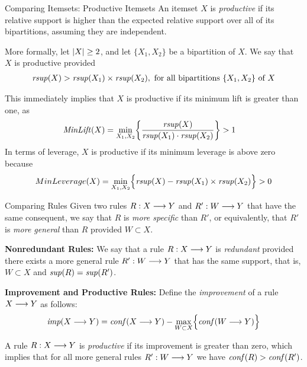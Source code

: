 \begin{frame}{Comparing Itemsets: Productive Itemsets}
An itemset $X$ is {\em productive}
if its
relative support is higher than the expected
relative support over all of its bipartitions,
assuming they are independent.

More formally, let $|X| \ge 2$, and let
$\{X_1,X_2\}$ be a bipartition of $X$.
We say that $X$ is productive provided
\begin{align*}
\mathit{rsup}(X) > \mathit{rsup}(X_1) \times \mathit{rsup}(X_2),
\text{ for all bipartitions } \{X_1, X_2\} \text{ of } X
\end{align*}

\bigskip
This immediately implies that
$X$ is productive if its minimum lift is greater than one, as
\begin{align*}
  \mathit{MinLift}(X) & =
  \min_{X_1,X_2} \biggl\{ \frac{\mathit{rsup}(X)}{\mathit{rsup}(X_1) \cdot
  \mathit{rsup}(X_2)} \biggr\}
  > 1
\end{align*}
In terms of leverage, $X$ is productive if its minimum leverage is above
zero because
\begin{align*}
MinLeverage(X) =
\min_{X_1,X_2} \Bigl\{
\mathit{rsup}(X) - \mathit{rsup}(X_1) \times \mathit{rsup}(X_2)
\Bigr\} > 0
\end{align*}
\end{frame}


\begin{frame}{Comparing Rules}
Given two rules $R: X \arule Y$ and $R': W \arule Y$ that have the same
consequent, we say that $R$ is {\em more specif\/{i}c} than $R'$, or
equivalently, that $R'$ is {\em more general} than $R$
provided $W \subset X$.

\medskip
{\bf Nonredundant Rules:} We say that a rule $R: X \arule Y$
is {\em redundant} provided there exists a more general rule
$R': W \arule Y$ that has the same support, that is, $W\subset X$ and $\mathit{sup}(R) = \mathit{sup}(R')$.

\medskip
{\bf Improvement and Productive Rules:}
Def\/{i}ne the {\em improvement}
of
a rule $X \arule Y$ as follows:
\begin{align*}
\textit{imp}(X \arule Y) = \conff (X \arule Y)
- \max_{W \subset X} \Bigl\{\conff (W \arule Y) \Bigr\}
\end{align*}

\medskip
A rule $R: X \arule Y$ is {\em productive} if
its improvement is greater than zero, which implies that
for all more general rules $R': W \arule
Y$ we have  $\mathit{conf}(R) > \mathit{conf}(R')$. 
\end{frame}


